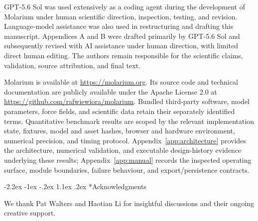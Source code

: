 \documentclass[11pt]{article}
\makeatletter
\renewcommand\section{\@startsection{section}{1}{\z@}%
  {-2.2ex \@plus -1ex \@minus -.2ex}%
  {1.1ex \@plus .2ex}%
  {\normalfont\Large\bfseries\color{molblue}}}
\makeatother
\begin{document}
GPT-5.6 Sol was used extensively as a coding agent during the development of Molarium under human scientific direction, inspection, testing, and revision. Language-model assistance was also used in restructuring and drafting this manuscript. Appendices A and B were drafted primarily by GPT-5.6 Sol and subsequently revised with AI assistance under human direction, with limited direct human editing. The authors remain responsible for the scientific claims, validation, source attribution, and final text.

Molarium is available at \url{https://molarium.org}. Its source code and technical documentation are publicly available under the Apache License 2.0 at \url{https://github.com/rafwiewiora/molarium}. Bundled third-party software, model parameters, force fields, and scientific data retain their separately identified terms. Quantitative benchmark results are scoped by the relevant implementation state, fixtures, model and asset hashes, browser and hardware environment, numerical precision, and timing protocol. Appendix~\ref{app:architecture} provides the architecture, numerical validation, and executable design-history evidence underlying these results; Appendix~\ref{app:manual} records the inspected operating surface, module boundaries, failure behaviour, and export/persistence contracts.

\section*{Acknowledgments}

We thank Pat Walters and Haotian Li for insightful discussions and their ongoing creative support.

\appendix
\end{document}
